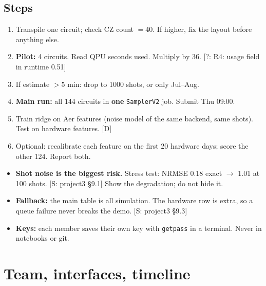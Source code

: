 \documentclass[11pt,a4paper]{article}
\newcommand{\tagbox}[2]{{\footnotesize\color{#1}\textsf{[#2]}}}
\newcommand{\supp}[1]{\tagbox{ForestGreen!70!black}{S: #1}}  %
\newcommand{\ours}{\tagbox{NavyBlue}{D}}                      %
\newcommand{\todo}[1]{\tagbox{Orange!85!black}{?: #1}}        %
\newcommand{\code}[1]{\texttt{\small #1}}
\begin{document}
\subsection{Steps}
\begin{enumerate}
\item Transpile one circuit; check CZ count $=40$. If higher, fix the layout before anything else.
\item \textbf{Pilot:} 4 circuits. Read QPU seconds used. Multiply by 36. \todo{R4: usage field in runtime 0.51}
\item If estimate $>5$ min: drop to 1000 shots, or only Jul--Aug.
\item \textbf{Main run:} all 144 circuits in \textbf{one} \code{SamplerV2} job. Submit Thu 09:00.
\item Train ridge on Aer features (noise model of the same backend, same shots). Test on hardware features. \ours
\item Optional: recalibrate each feature on the first 20 hardware days; score the other 124. Report both.
\end{enumerate}

\begin{watch}
\begin{itemize}
\item \textbf{Shot noise is the biggest risk.} Stress test: NRMSE 0.18 exact $\to$ 1.01 at 100 shots.
  \supp{project3 \S9.1} Show the degradation; do not hide it.
\item \textbf{Fallback:} the main table is all simulation. The hardware row is extra, so a queue failure never breaks
  the demo. \supp{project3 \S9.3}
\item \textbf{Keys:} each member saves their own key with \code{getpass} in a terminal. Never in notebooks or git.
\end{itemize}
\end{watch}

\section{Team, interfaces, timeline}
\end{document}
